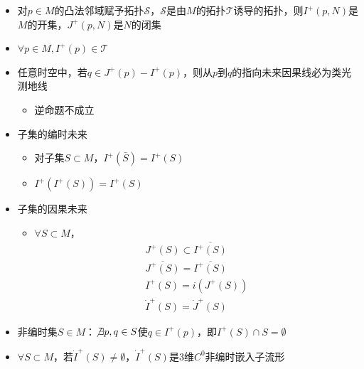 \begin{itemize}
\begin{enumerate}
    \end{enumerate}
    \item 对$p \in M$的凸法邻域赋予拓扑$\mathscr{S}$，$\mathscr{S}$是由$M$的拓扑$\mathscr{T}$诱导的拓扑，则$I^+(p, N)$是$M$的开集，$J^+(p, N)$是$N$的闭集
    \item $\forall p \in M, I^+(p) \in \mathscr{T}$
    \item 任意时空中，若$q \in J^+(p) - I^+(p)$，则从$p$到$q$的指向未来因果线必为类光测地线
    \begin{itemize}
        \item 逆命题不成立
    \end{itemize}
    \item 子集的编时未来
    \begin{itemize}
        \item 对子集$S \subset M$，$I^+(\bar{S})=I^+(S)$
        \item $I^+(I^+(S))=I^+(S)$
    \end{itemize}
    \item 子集的因果未来
    \begin{itemize}
        \item $\forall S \subset M$，
        \begin{gather*}
            J^+(S) \subset \overline{I^+(S)}
            \\
            \overline{J^+(S)} = \overline{I^+(S)}
            \\
            I^+(S) = i(J^+(S))
            \\
            \dot{I}^+(S) = \dot{J}^+(S)
        \end{gather*}
    \end{itemize}
    \item 非编时集$S \in M$：$\not \exists p, q \in S$使$q \in I^+(p)$，即$I^+(S) \cap S = \emptyset$
    \item $\forall S \subset M$，若$\dot{I}^+(S) \neq \emptyset$，$\dot{I}^+(S)$是3维$C^0$非编时嵌入子流形
\end{itemize}

